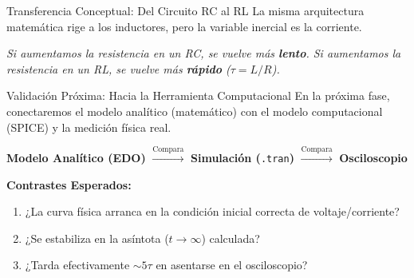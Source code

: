 \documentclass[aspectratio=169, 10pt]{beamer}
\begin{document}
\begin{frame}{Transferencia Conceptual: Del Circuito RC al RL}
    La misma arquitectura matemática rige a los inductores, pero la variable inercial es la corriente.
    \vspace{0.3cm}
    
    \begin{table}
        \centering
        \renewcommand{\arraystretch}{1.4}
    \end{table}
    \textit{Si aumentamos la resistencia en un RC, se vuelve más \textbf{lento}. Si aumentamos la resistencia en un RL, se vuelve más \textbf{rápido} ($\tau = L/R$).}
\end{frame}

\begin{frame}{Validación Próxima: Hacia la Herramienta Computacional}
    En la próxima fase, conectaremos el modelo analítico (matemático) con el modelo computacional (SPICE) y la medición física real.
    \vspace{0.4cm}
    
    \begin{center}
        \textbf{Modelo Analítico (EDO)} $\xrightarrow{\text{Compara}}$ \textbf{Simulación (}\texttt{.tran}\textbf{)} $\xrightarrow{\text{Compara}}$ \textbf{Osciloscopio}
    \end{center}
    
    \vspace{0.4cm}
    \textbf{Contrastes Esperados:}
    \begin{enumerate}
        \item ¿La curva física arranca en la condición inicial correcta de voltaje/corriente?
        \item ¿Se estabiliza en la asíntota ($t \to \infty$) calculada?
        \item ¿Tarda efectivamente $\sim 5\tau$ en asentarse en el osciloscopio?
    \end{enumerate}
\end{frame}
\end{document}
